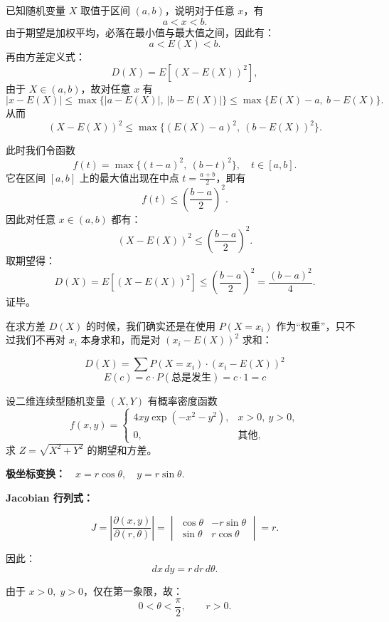 \begin{solution}
已知随机变量 $X$ 取值于区间 $(a, b)$，说明对于任意 $x$，有
\[
a < x < b.
\]
由于期望是加权平均，必落在最小值与最大值之间，因此有：
\[
a < E(X) < b.
\]
再由方差定义式：
\[
D(X) = E[(X - E(X))^2],
\]
由于 $X \in (a, b)$，故对任意 $x$ 有
\[
|x - E(X)| \le \max\{|a - E(X)|,\ |b - E(X)|\} \le \max\{E(X) - a,\ b - E(X)\}.
\]
从而
\[
(X - E(X))^2 \le \max\{(E(X) - a)^2,\ (b - E(X))^2\}.
\]

此时我们令函数
\[
f(t) = \max\{(t - a)^2,\ (b - t)^2\},\quad t \in [a,b].
\]
它在区间 $[a,b]$ 上的最大值出现在中点 $t = \frac{a + b}{2}$，即有
\[
f(t) \le \left( \frac{b - a}{2} \right)^2.
\]
因此对任意 $x\in(a,b)$ 都有：
\[
(X - E(X))^2 \le \left( \frac{b - a}{2} \right)^2.
\]
取期望得：
\[
D(X) = E[(X - E(X))^2] \le \left( \frac{b - a}{2} \right)^2 = \frac{(b - a)^2}{4}.
\]
证毕。
\end{solution}
\begin{dxtips}
    在求方差 $D(X)$ 的时候，我们确实还是在使用 $P(X = x_i)$ 作为“权重”，只不过我们不再对 $x_i$ 本身求和，而是对 $(x_i - E(X))^2$ 求和：

\[
D(X)=\sum P(X = x_i)\cdot (x_i - E(X))^2
\]\[
E(c) = c \cdot P(\text{总是发生}) = c \cdot 1 = c
\]
\end{dxtips}
\begin{homework}[3.22]
设二维连续型随机变量 $(X, Y)$ 有概率密度函数
\[
f(x, y) =
\begin{cases}
4xy \exp\left(-x^2 - y^2\right), & x > 0,\ y > 0, \\[1ex]
0, & \text{其他},
\end{cases}
\]
求 $Z = \sqrt{X^2 + Y^2}$ 的期望和方差。
\end{homework}
\begin{dxtips}
 \textbf{极坐标变换：}$\quad 
x = r\cos\theta,\quad y = r\sin\theta.$

\textbf{Jacobian 行列式：}

\[
J = \left| \frac{\partial(x,y)}{\partial(r,\theta)} \right|
= \begin{vmatrix}
\cos\theta & -r\sin\theta \\
\sin\theta & r\cos\theta
\end{vmatrix}
= r.
\]

因此：
\[
dx\,dy = r\,dr\,d\theta.
\]

由于 \(x>0,\; y>0\)，仅在第一象限，故：
\[
0 < \theta < \frac{\pi}{2},\qquad r > 0.
\] 
\end{dxtips}
